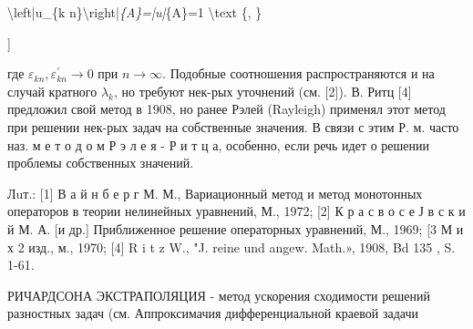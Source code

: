\documentclass[10pt]{article}
\begin{document}
\textbackslash left|u\_\{k n\}\textbackslash right|\textit{\{A\}=|u|}\{A\}=1 \textbackslash text \{, \}

]



где $\varepsilon_{k n}, \varepsilon_{k n}^{\prime} \rightarrow 0$ при $n \rightarrow \infty$. Подобные соотношения распространяются и на случай кратного $\lambda_{k}$, но требуют нек-рых уточнений (см. [2]). В. Ритц [4] предложил свой метод в 1908, но ранее Рэлей (Rayleigh) применял этот метод при решении нек-рых задач на собственные значения. В связи с этим Р. м. часто наз. м е т о д о м Р э л е я - Р и т ц а, особенно, если речь идет о решении проблемы собственных значений.



Лuт.: [1] В а й н б е р г М. М., Вариационный метод и метод монотонных операторов в теории нелинейных уравнений, М., 1972; [2] К р а с в о с е Ј в с к и й М. А. [и др.] Приближенное решение операторных уравнений, М., 1969; [3 М и х 2 изд., м., 1970; [4] R i t z W., "J. reine und angew. Math.», 1908, Bd 135 , S. 1-61.



РИЧАРДСОНА ЭКСТРАПОЛЯЦИЯ - метод ускорения сходимости решений разностных задач (см. Аппроксимачия дифференциальной краевой задачи
\end{document}
